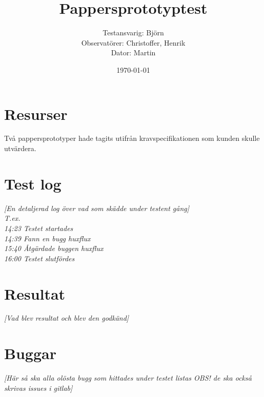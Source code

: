 \documentclass[a4paper,10pt]{article}
\title{Pappersprototyptest}
\author{Testansvarig: Björn\\Observatörer: Christoffer, Henrik\\ Dator: Martin}
\date{\today}
\begin{document}
\maketitle\clearpage

\section{Resurser}
Två pappersprototyper hade tagits utifrån kravspecifikationen som kunden skulle utvärdera.

\section{Test log}
\emph{[En detaljerad log över vad som skädde under testent gång]\\
T.ex. \\ 14:23 Testet startades \\ 14:39 Fann en bugg huxflux \\ 15:40 Åtgärdade buggen huxflux \\ 16:00 Testet slutfördes}
\

\section{Resultat}
\emph{[Vad blev resultat och blev den godkänd]}

\section{Buggar}
\emph{[Här så ska alla olösta bugg som hittades under testet listas OBS! de ska också skrivas issues i gitlab]}
\end{document}
